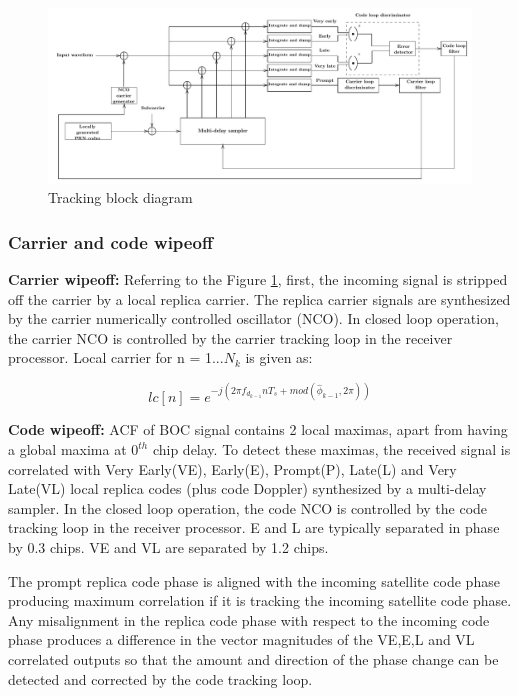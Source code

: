 \documentclass[conference]{IEEEtran}
\begin{document}
\begin{normalsize}
\begin{figure}[ht]
\centering
\includegraphics[width=1.5\columnwidth]{figs/tracking}
\centering
\caption{Tracking block diagram}
\label{fig:tracking}
\end{figure}
\end{normalsize}
\subsubsection{Carrier and code wipeoff}
\textbf{Carrier wipeoff: }Referring to the Figure \ref{fig:tracking}, first, the incoming signal is 
stripped off the carrier by a local replica carrier. The replica carrier signals are synthesized 
by the carrier numerically controlled oscillator (NCO). In closed loop operation, the carrier NCO is 
controlled by the carrier tracking loop in the receiver processor. Local carrier for n = 1...$N_k$
is given as:

\begin{equation}
	lc[n] = e^{-j(2\pi \hat{f}_{d_{k-1}}nT_s+ mod(\hat{\phi}_{k-1},2\pi))}
	\label{eq:local_replica}
\end{equation}

\textbf{Code wipeoff: }ACF of BOC signal contains 2 local maximas, apart from having a global maxima at $0^{th}$ chip delay.
To detect these maximas, the received signal is  correlated with Very Early(VE), Early(E), 
Prompt(P), Late(L) and Very Late(VL) local replica codes (plus code Doppler) synthesized by a 
multi-delay sampler. In the closed loop operation, the code NCO is controlled by the code tracking 
loop in the receiver processor. E and L are typically separated in phase by 0.3 chips. VE and VL are
separated by 1.2 chips. 

The prompt replica code phase is aligned with the 
incoming satellite code phase producing maximum correlation if it is tracking the incoming satellite code 
phase.  Any misalignment in the replica code phase with respect to the incoming code phase produces 
a difference in the vector magnitudes of the VE,E,L and VL correlated outputs so that the amount 
and direction of the phase change can be detected and corrected by the code tracking loop.
\end{document}
